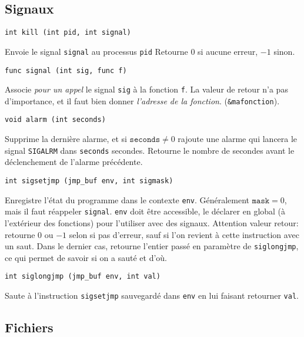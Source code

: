 \documentclass[a4paper]{article}
\begin{document}
\begin{multicols*}{2}
    \subsection{Signaux}

    \begin{lstlisting}
int kill (int pid, int signal)
    \end{lstlisting}
    Envoie le signal \texttt{signal} au processus \texttt{pid}
    Retourne $0$ si aucune erreur, $-1$ sinon.

    \begin{lstlisting}
func signal (int sig, func f)
    \end{lstlisting}
    Associe \emph{pour un appel} le signal \texttt{sig} à la fonction \texttt{f}.
    La valeur de retour n'a pas d'importance, et il faut bien donner \emph{l'adresse de la fonction}.
    (\texttt{\&mafonction}).

    \begin{lstlisting}
void alarm (int seconds)
    \end{lstlisting}
    Supprime la dernière alarme, et si $\texttt{seconds} \neq 0$ rajoute une alarme qui lancera le signal \texttt{SIGALRM} dans \texttt{seconds} secondes.
    Retourne le nombre de secondes avant le déclenchement de l'alarme précédente.

    \begin{lstlisting}
int sigsetjmp (jmp_buf env, int sigmask)
    \end{lstlisting}
    Enregistre l'état du programme dans le contexte \texttt{env}. Généralement $\texttt{mask} = 0$, mais il faut réappeler \texttt{signal}.
    \texttt{env} doit être accessible, le déclarer en global (à l'extérieur des fonctions) pour l'utiliser avec des signaux.
    Attention valeur retour: retourne $0$ ou $-1$ selon si pas d'erreur, sauf si l'on revient à cette instruction avec un saut.
    Dans le dernier cas, retourne l'entier passé en paramètre de \texttt{siglongjmp}, ce qui permet de savoir si on a sauté et d'où.

    \begin{lstlisting}
int siglongjmp (jmp_buf env, int val)
    \end{lstlisting}
    Saute à l'instruction \texttt{sigsetjmp} sauvegardé dans \texttt{env} en lui faisant retourner \texttt{val}.

    \subsection{Fichiers}


\end{multicols*}
\end{document}
